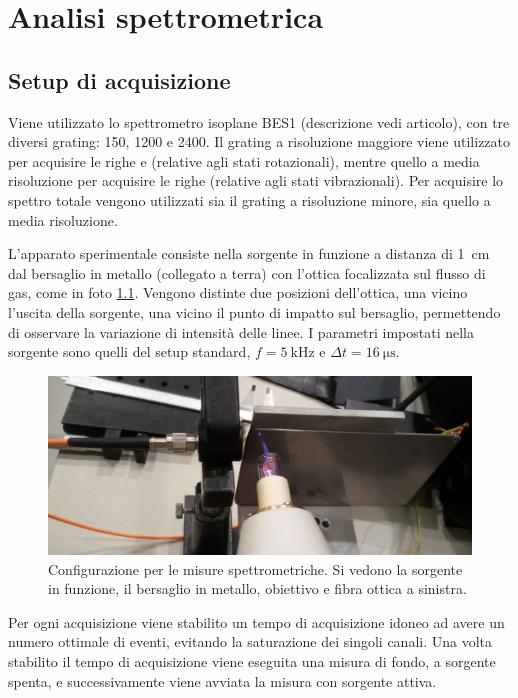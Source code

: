 \chapter{Analisi spettrometrica}
\label{ch:spettro}

\section{Setup di acquisizione}
Viene utilizzato lo spettrometro isoplane BES1 (descrizione vedi articolo), con tre diversi grating: 150, 1200 e 2400. Il grating a risoluzione maggiore viene utilizzato per acquisire le righe  e  (relative agli stati rotazionali), mentre quello a media risoluzione per acquisire le righe  (relative agli stati vibrazionali). Per acquisire lo spettro totale vengono utilizzati sia il grating a risoluzione minore, sia quello a media risoluzione.

L'apparato sperimentale consiste nella sorgente in funzione a distanza di \SI{1}{\centi\metre} dal bersaglio in metallo (collegato a terra) con l'ottica focalizzata sul flusso di gas, come in foto \ref{fig:app}. Vengono distinte due posizioni dell'ottica, una vicino l'uscita della sorgente, una vicino il punto di impatto sul bersaglio, permettendo di osservare la variazione di intensità delle linee.
I parametri impostati nella sorgente sono quelli del setup standard, $f = \SI{5}{\kilo\hertz}$ e $\Delta t = \SI{16}{\micro\second}$.

\begin{figure}
\centering
\includegraphics[width=.6\textwidth]{Immagini/apparato.jpg}
\caption{Configurazione per le misure spettrometriche. Si vedono la sorgente in funzione, il bersaglio in metallo, obiettivo e fibra ottica a sinistra.}
\label{fig:app}
\end{figure}


Per ogni acquisizione viene stabilito un tempo di acquisizione idoneo ad avere un numero ottimale di eventi, evitando la saturazione dei singoli canali. Una volta stabilito il tempo di acquisizione viene eseguita una misura di fondo, a sorgente spenta, e successivamente viene avviata la misura con sorgente attiva.


